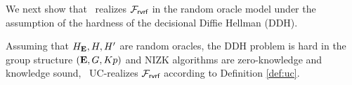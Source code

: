 We next show that \name \ realizes $ \mathcal{F}_{\textsf{rvrf}} $  in the random oracle model under the assumption of the hardness of the decisional Diffie Hellman (DDH).



\begin{theorem}
	Assuming that $ H_{\mathbf{E}}, H,H' $ are random oracles,  the DDH problem is hard in the group structure $ ({\mathbf{E}}, G,K p) $ and NIZK algorithms are zero-knowledge and knowledge sound, \name \ UC-realizes $\mathcal{F}_{\textsf{rvrf}}$ according to Definition \ref{def:uc}.
\end{theorem}

